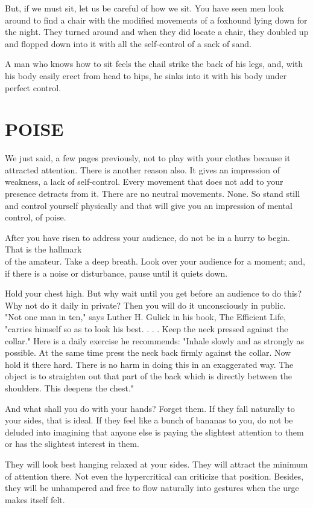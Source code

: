 \documentclass[10pt]{article}
\begin{document}
But, if we must sit, let us be careful of how we sit. You have seen men look around to find a chair with the modified movements of a foxhound lying down for the night. They turned around and when they did locate a chair, they doubled up and flopped down into it with all the self-control of a sack of sand.

A man who knows how to sit feels the chail strike the back of his legs, and, with his body easily erect from head to hips, he sinks into it with his body under perfect control.

\section*{POISE}
We just said, a few pages previously, not to play with your clothes because it attracted attention. There is another reason also. It gives an impression of weakness, a lack of self-control. Every movement that does not add to your presence detracts from it. There are no neutral movements. None. So stand still and control yourself physically and that will give you an impression of mental control, of poise.

After you have risen to address your audience, do not be in a hurry to begin. That is the hallmark\\
of the amateur. Take a deep breath. Look over your audience for a moment; and, if there is a noise or disturbance, pause until it quiets down.

Hold your chest high. But why wait until you get before an audience to do this? Why not do it daily in private? Then you will do it unconsciously in public.\\
"Not one man in ten," says Luther H. Gulick in his book, The Efficient Life, "carries himself so as to look his best. . . . Keep the neck pressed against the collar." Here is a daily exercise he recommends: "Inhale slowly and as strongly as possible. At the same time press the neck back firmly against the collar. Now hold it there hard. There is no harm in doing this in an exaggerated way. The object is to straighten out that part of the back which is directly between the shoulders. This deepens the chest."

And what shall you do with your hands? Forget them. If they fall naturally to your sides, that is ideal. If they feel like a bunch of bananas to you, do not be deluded into imagining that anyone else is paying the slightest attention to them or has the slightest interest in them.

They will look best hanging relaxed at your sides. They will attract the minimum of attention there. Not even the hypercritical can criticize that position. Besides, they will be unhampered and free to flow naturally into gestures when the urge makes itself felt.
\end{document}
